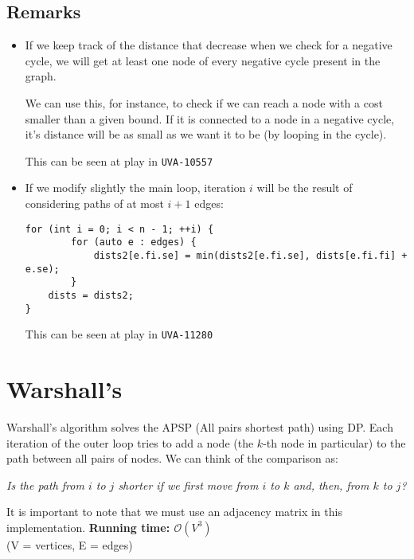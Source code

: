 \subsection*{Remarks}
\begin{itemize}
	\item If we keep track of the distance that decrease when we check for
		a negative cycle, we will get at least one node of 
		every negative cycle present in the graph.

		We can use this, for instance, to check if we can reach a node with 
		a cost smaller than a given bound. If it is connected to a node in a 
		negative cycle, it's distance will be as small as we want it to be
		(by looping in the cycle).

		This can be seen at play in \texttt{UVA-10557}
		\newpage
	\item If we modify slightly the main loop, iteration $i$ will be the 
		result of considering paths of at most $i+1$ edges:
		\begin{verbatim}
for (int i = 0; i < n - 1; ++i) {
        for (auto e : edges) {
            dists2[e.fi.se] = min(dists2[e.fi.se], dists[e.fi.fi] + e.se);
        }
	dists = dists2;
}
		\end{verbatim}
		This can be seen at play in \texttt{UVA-11280}
		

\end{itemize}	

\section{Warshall's}
Warshall's algorithm solves the APSP (All pairs shortest path) using DP.
Each iteration of the outer loop tries to add a node (the $k$-th node in
particular) to the path between all pairs of nodes. 
We can think of the comparison as: 
\begin{center}
		\textit{ Is the path from $i$ to $j$ shorter if we first 
		move from $i$ to $k$ and, then, from $k$ to $j$? }
\end{center}
It is important to note that we must use an adjacency matrix in this
implementation.
\noindent \textbf{\boldmath Running time: $\mathcal{O}(V^3)$}
\\ {\small (V = vertices, E = edges)}
